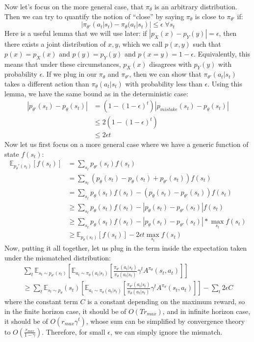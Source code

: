Now let's focus on the more general case, that $\pi_\theta$ is an arbitrary distribution. Then we can try to quantify the notion of ``close'' by saying $\pi_\theta$ is close to $\pi_{\theta'}$ if:
$$|\pi_{\theta'}(a_t|s_t) - \pi_\theta(a_t|s_t)| \leq \epsilon \; \forall s_t$$
Here is a useful lemma that we will use later: if $|p_X(x) - p_Y(y)| = \epsilon$, then there exists a joint distribution of $x,y$, which we call $p(x,y)$ such that $p(x) = p_X(x)$ and $p(y) = p_Y(y)$ and $p(x=y) = 1-\epsilon$. Equivalently, this means that under these circumstances, $p_X(x)$ disagrees with $p_Y(y)$ with probability $\epsilon$. If we plug in our $\pi_\theta$ and $\pi_{\theta'}$, then we can show that $\pi_{\theta'}(a_t|s_t)$ takes a different action than $\pi_\theta(a_t|s_t)$ with probability less than $\epsilon$. Using this lemma, we have the same bound as in the deterministic case:
\begin{align*}
  |p_{\theta'}(s_t) - p_\theta(s_t)| &= (1-(1-\epsilon)^t)|p_{mistake}(s_t) - p_\theta(s_t)|\\
  &\leq 2(1-(1-\epsilon)^t)\\
  &\leq2\epsilon t
\end{align*}
Now let us first focus on a more general case where we have a generic function of state $f(s_t)$:
\begin{align*}
    \mathbb{E}_{p_\theta'(s_t)}[f(s_t)] &= \sum_{s_t}p_{\theta'}(s_t)f(s_t)\\
    &= \sum_{s_t}(p_\theta(s_t) - p_\theta(s_t)+p_{\theta'}(s_t))f(s_t)\\
    &=\sum_{s_t}p_\theta(s_t)f(s_t) - (p_\theta(s_t)-p_{\theta'}(s_t))f(s_t)\\
    &\geq \sum_{s_t}p_\theta(s_t)f(s_t) - |p_\theta(s_t) - p_{\theta'}(s_t)|f(s_t)\\
    &\geq \sum_{s_t}p_\theta(s_t)f(s_t) - |p_\theta(s_t) - p_{\theta'}(s_t)|*\max_{s_t}f(s_t)\\
    &\geq \mathbb{E}_{p_\theta(s_t)}[f(s_t)] - 2\epsilon t\max_{s_t}f(s_t)
\end{align*}
Now, putting it all together, let us plug in the term inside the expectation taken under the mismatched distribution:
\begin{multline}
    \sum_t\mathbb{E}_{s_t\sim p_{\theta'}(s_t)}\left[\mathbb{E}_{a_t\sim \pi_\theta(a_t|s_t)}\left[\frac{\pi_{\theta'}(a_t|s_t)}{\pi_\theta(a_t|s_t)}\gamma^t A^{\pi_\theta}(s_t,a_t)\right]\right]\\
    \geq \sum_t\mathbb{E}_{s_t\sim p_{\theta}}(s_t)\left[\mathbb{E}_{a_t\sim \pi_\theta(a_t|s_t)}\left[\frac{\pi_{\theta'}(a_t|s_t)}{\pi_\theta(a_t|s_t)}\gamma^t A^{\pi_\theta}(s_t,a_t)\right]\right] - \sum_t 2\epsilon C
\end{multline}
where the constant term $C$ is a constant depending on the maximum reward, so in the finite horizon case, it should be of $O(Tr_{max})$, and in infinite horizon case, it should be of $O(r_{max}\gamma^t)$, whose sum can be simplified by convergence theory to $O(\frac{r_{max}}{1-\gamma})$. Therefore, for small $\epsilon$, we can simply ignore the mismatch. 

